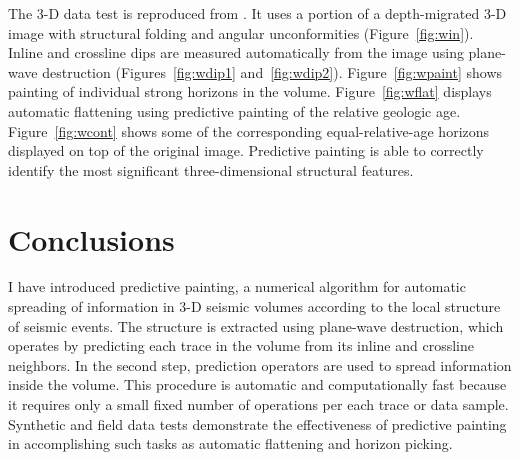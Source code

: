 

The 3-D data test is reproduced from \cite{lomask}. It uses a portion
of a depth-migrated 3-D image with structural folding and angular
unconformities (Figure~\ref{fig:win}). Inline and crossline dips are
measured automatically from the image using plane-wave destruction
(Figures~\ref{fig:wdip1} and~\ref{fig:wdip2}). Figure~\ref{fig:wpaint}
shows painting of individual strong horizons in the volume.
Figure~\ref{fig:wflat} displays automatic flattening using predictive
painting of the relative geologic age. %
Figure~\ref{fig:wcont} shows
some of the corresponding equal-relative-age horizons displayed on top
of the original image. Predictive painting is able to correctly
identify the most significant three-dimensional structural features.






\section{Conclusions}
I have introduced predictive painting, a numerical algorithm for
automatic spreading of information in 3-D seismic volumes according to
the local structure of seismic events. The structure is extracted
using plane-wave destruction, which operates by predicting each trace
in the volume from its inline and crossline neighbors. In the second
step, prediction operators are used to spread information inside the
volume. This procedure is automatic and computationally fast because
it requires only a small fixed number of operations per each trace or
data sample. Synthetic and field data tests demonstrate the
effectiveness of predictive painting in accomplishing such tasks as
automatic flattening and horizon picking.

